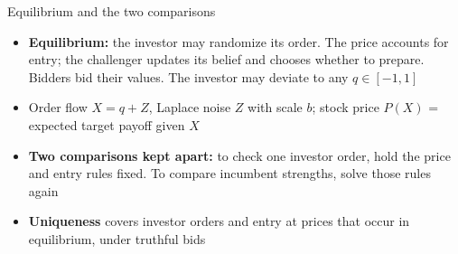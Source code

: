 \documentclass[10pt,aspectratio=169]{beamer}
\newcommand{\NavGap}{\par\vspace{0.45cm}}%
\let\AdapterBackButton\BackButton
\renewcommand{\BackButton}[1]{\NavGap\AdapterBackButton{#1}}%
\begin{document}
\begin{frame}[label=A7]{Equilibrium and the two comparisons}
\hypertarget{app:eq}{}
\begin{itemize}\setlength{\itemsep}{6pt}
\item \textbf{Equilibrium:} the investor may randomize its order. The price accounts for entry; the challenger updates its belief and chooses whether to prepare. Bidders bid their values. The investor may deviate to any $q\in[-1,1]$
\item Order flow $X=q+Z$, Laplace noise $Z$ with scale $b$; stock price $P(X)$ = expected target payoff given $X$
\item \textbf{Two comparisons kept apart:} to check one investor order, hold the price and entry rules fixed. To compare incumbent strengths, solve those rules again
\item \textbf{Uniqueness} covers investor orders and entry at prices that occur in equilibrium, under truthful bids
\end{itemize}
\end{frame}
\end{document}

